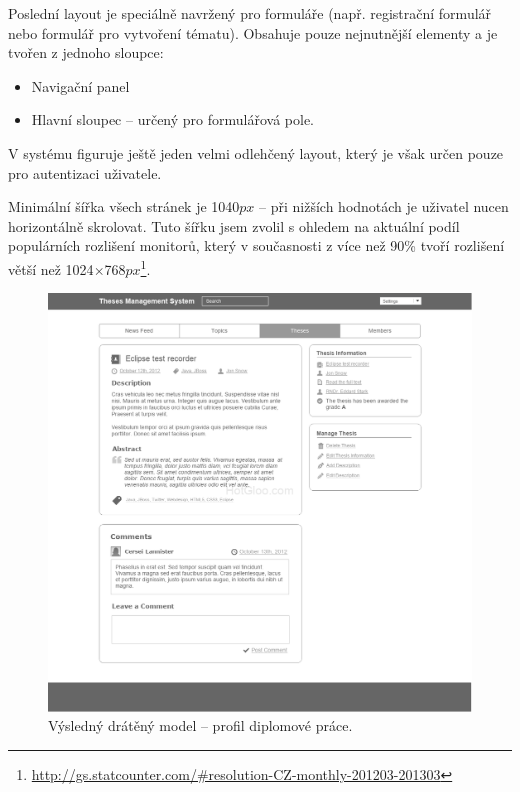 Poslední layout je speciálně navržený pro formuláře (např. registrační formulář nebo formulář pro vytvoření tématu). Obsahuje pouze nejnutnější elementy a je tvořen z jednoho sloupce:

\begin{itemize}
    \item Navigační panel
    \item Hlavní sloupec -- určený pro formulářová pole.
\end{itemize}

V systému figuruje ještě jeden velmi odlehčený layout, který je však určen pouze pro autentizaci uživatele.

Minimální šířka všech stránek je 1040$px$ -- při nižších hodnotách je uživatel nucen horizontálně skrolovat. Tuto šířku jsem zvolil s ohledem na aktuální podíl populárních rozlišení monitorů, který v současnosti z více než 90\% tvoří rozlišení větší než 1024$\times$768$px$\footnote{\url{http://gs.statcounter.com/\#resolution-CZ-monthly-201203-201303}}.

\begin{figure}[htbp]
    \centering
    \includegraphics[width=\textwidth]{images/main-layout.png}
    \caption{Výsledný drátěný model -- profil diplomové práce.}
    \label{img:layout1}
\end{figure}

